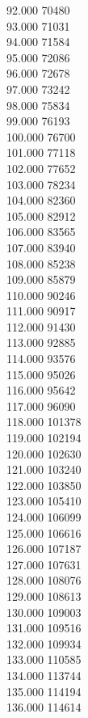 { 92.000	70480 \\
 93.000	71031 \\
 94.000	71584 \\
 95.000	72086 \\
 96.000	72678 \\
 97.000	73242 \\
 98.000	75834 \\
 99.000	76193 \\
 100.000	76700 \\
 101.000	77118 \\
 102.000	77652 \\
 103.000	78234 \\
 104.000	82360 \\
 105.000	82912 \\
 106.000	83565 \\
 107.000	83940 \\
 108.000	85238 \\
 109.000	85879 \\
 110.000	90246 \\
 111.000	90917 \\
 112.000	91430 \\
 113.000	92885 \\
 114.000	93576 \\
 115.000	95026 \\
 116.000	95642 \\
 117.000	96090 \\
 118.000	101378 \\
 119.000	102194 \\
 120.000	102630 \\
 121.000	103240 \\
 122.000	103850 \\
 123.000	105410 \\
 124.000	106099 \\
 125.000	106616 \\
 126.000	107187 \\
 127.000	107631 \\
 128.000	108076 \\
 129.000	108613 \\
 130.000	109003 \\
 131.000	109516 \\
 132.000	109934 \\
 133.000	110585 \\
 134.000	113744 \\
 135.000	114194 \\
 136.000	114614 \\
}
